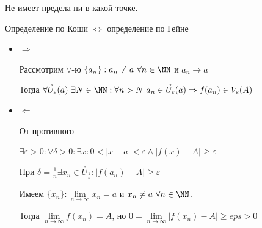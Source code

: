 Не имеет предела ни в какой точке.

\begin{thrm}{}{}
    Определение по Коши \( \Leftrightarrow \) определение по Гейне
\end{thrm}

\begin{itemize}
    \item
        \( \Rightarrow \)

        Рассмотрим \( \forall \)-ю \( \{ a_n \} : a_n \neq a \ \forall n \in \NN \) и \( a_n \to a \)

        Тогда 
        \( 
            \forall \mathring{U_{\varepsilon}} (a) \ \exists N \in \NN : 
            \forall n > N \ a_n \in \mathring{U_{\varepsilon}} (a) \Rightarrow f(a_n) \in V_{\varepsilon} (A)
        \)
    \item
        \( \Leftarrow \)

        От противного

        \( 
            \exists \varepsilon > 0 : \forall \delta > 0 : \exists x : 
            0 < |x - a| < \varepsilon \land |f(x) - A| \geq \varepsilon 
        \)

        При
        \(
            \delta = \frac{1}{n} \exists x_n \in \mathring{U_{\frac{1}{n}}} : |f(a_n) - A| \geq \varepsilon
        \)

        Имеем \( \{ x_n \} : \lim\limits_{n \to \infty} x_n = a \) и \( x_n \neq a \ \forall n \in \NN \).

        Тогда \( \lim\limits_{n \to \infty} f(x_n) = A \), но \( 0 = \lim\limits_{n \to \infty} |f(x_n) - A| \geq eps > 0 \)
\end{itemize}

